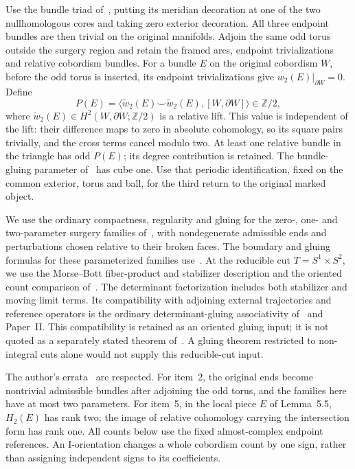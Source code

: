 \documentclass[11pt]{amsart}
\theoremstyle{definition}
\theoremstyle{remark}
\theoremstyle{plain}
\newcommand{\ZZ}{\mathbb Z}
\begin{document}
Use the bundle triad of~\cite[Sections~3.1--3.7 and~7.5]{Scaduto},
putting its meridian decoration at one of the two nullhomologous
cores and taking zero exterior decoration. All three endpoint
bundles are then trivial on the original manifolds. Adjoin the
same odd torus outside the surgery region and retain the framed
arcs, endpoint trivializations and relative cobordism bundles.
For a bundle $E$ on the original cobordism $W$, before the odd
torus is inserted, its endpoint trivializations give
$w_2(E)|_{\partial W}=0$. Define
\[
 P(E)=\langle\widetilde w_2(E)\smile\widetilde w_2(E),
                    [W,\partial W]\rangle\in\ZZ/2,
\]
where $\widetilde w_2(E)\in H^2(W,\partial W;\ZZ/2)$ is a
relative lift. This value is independent of the lift: their
difference maps to zero in absolute cohomology, so its square
pairs trivially, and the cross terms cancel modulo two.
At least one relative bundle in the triangle has odd $P(E)$;
its degree contribution is retained. The
bundle-gluing parameter of~\cite[(3)]{Scaduto} has cube one.
Use that periodic identification, fixed on the common exterior,
torus and ball, for the third return to the original marked object.

We use the ordinary compactness, regularity and gluing for the
zero-, one- and two-parameter surgery families
of~\cite[Sections~4.4--5.3]{Scaduto}, with nondegenerate admissible
ends and perturbations chosen relative to their broken faces.
The boundary and gluing formulas for these parameterized families
use~\cite[Section~3.9]{KM}.
At the reducible cut $T=S^1\times S^2$, we use the Morse--Bott
fiber-product and stabilizer description and the oriented count
comparison of~\cite[Lemma~5.4 and the proof of Lemma~5.2]{Scaduto}.
The determinant factorization includes both stabilizer and moving
limit terms. Its compatibility with adjoining external trajectories
and reference operators is the ordinary determinant-gluing
associativity of~\cite[Sections~3.8--3.9]{KM} and Paper~II.
This compatibility is retained as an oriented gluing input; it is
not quoted as a separately stated theorem of~\cite{Scaduto}.
A gluing theorem restricted to non-integral cuts alone would not
supply this reducible-cut input.

The author's errata~\cite{ScadutoErrata} are respected. For item~2,
the original ends become nontrivial admissible
bundles after adjoining the odd torus, and the families here have
at most two parameters. For item~5, in the local piece $E$ of Lemma~5.5,
$H_2(E)$ has rank two; the image of relative cohomology carrying
the intersection form has rank one. All counts below use the
fixed almost-complex endpoint references. An I-orientation
changes a whole cobordism count by one sign, rather than assigning
independent signs to its coefficients.
\end{document}
